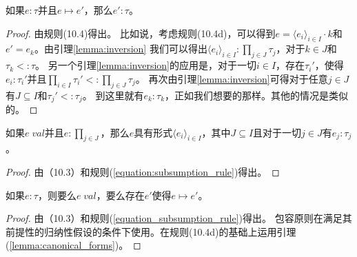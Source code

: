 \begin{theorem}[保型]
    如果$e:\tau$并且$e\longmapsto e'$，那么$e':\tau$。
\end{theorem}
\begin{proof}
    由规则(10.4)得出。
    比如说，考虑规则(10.4d)，可以得到$e=\langle e_i \rangle_{i\in I}\cdot k$和$e'=e_k$。由引理\ref{lemma:inversion}
    我们可以得出$\langle e_i \rangle_{i\in I}:\prod_{j\in J}\tau_j$，对于$k\in J$和$\tau_k<:\tau$。 
    另一个引理\ref{lemma:inversion}的应用是，对于一切$i\in I$，存在$\tau_i'$，使得
    $e_i:\tau_i'$并且$\prod_{i\in I}\tau_i'<:\prod_{j \in J}\tau_j$。 
    再次由引理\ref{lemma:inversion}可得对于任意$j\in J$有$J\subseteq I$和$\tau_j'<:\tau_j$。
    到这里就有$e_k:\tau_k$，正如我们想要的那样。其他的情况是类似的。
\end{proof}
\begin{lemma}[正规形式]\label{lemma:canonical_forms}
    如果$e\;val$并且$e:\prod_{j\in J}$，那么$e$具有形式$\langle e_i\rangle_{i\in I}$，其中$J\subseteq I$且对于一切$j\in J$有$e_j:\tau_j$。
\end{lemma}
\begin{proof}
    由（10.3）和规则(\ref{equation:subsumption_rule})得出。
\end{proof}
\begin{theorem}[推广]
    如果$e:\tau$，则要么$e\;val$，要么存在$e'$使得$e\longmapsto e'$。
\end{theorem}
\begin{proof}
    由（10.3）和规则(\ref{equation_subsumption_rule})得出。
    包容原则在满足其前提性的归纳性假设的条件下使用。在规则(10.4d)的基础上运用引理(\ref{lemma:canonical_forms})。
\end{proof}

